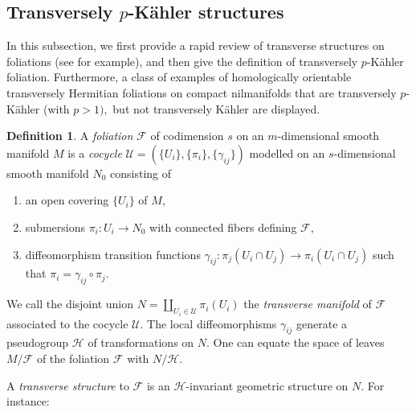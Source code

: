 \documentclass[12pt]{amsart}
\numberwithin{equation}{section}
\theoremstyle{definition}
\theoremstyle{definition}
\newtheorem{definition}  [theorem]     {Definition}
\theoremstyle{definition}
\renewcommand{\1}{\mathsf{1}}
\renewcommand{\>}{\rightarrow}
\def\mc{\mathcal}
\theoremstyle{plain} %
\theoremstyle{plain} %
\theoremstyle{plain} %
\begin{document}
	
	\subsection{Transversely $p$-K\"ahler structures}\label{subsection transversely }
	In this subsection, we first provide a rapid review of  transverse structures on foliations (see \cite{Mo88,Ni11} for example), and then give the definition of transversely $p$-K\"ahler foliation.  Furthermore, a class of examples of homologically orientable transversely Hermitian foliations on compact nilmanifolds that are transversely $p$-K\"ahler (with $p>1),$ but not transversely K\"ahler  are displayed.
	\begin{definition}
		A \textit{foliation} $\mathcal F$  of  codimension $s$ on an $m$-dimensional smooth manifold $M$ is a \textit{cocycle} $\mathscr U=(\{U_i\},\{\pi_i\},\{\gamma_{ij}\})$ modelled on an $s$-dimensional smooth manifold $N_0$ consisting of
		\begin{enumerate}[$(i)$]
			\item an open covering $\{U_i\}$ of $M$,
			\item submersions $\pi_i:U_i\to N_0$ with connected fibers defining $\mathcal{F}$,
			\item diffeomorphism transition functions $\gamma_{ij}:\pi_j(U_i\cap U_j)\to \pi_i(U_i\cap U_j)$ such that $\pi_i=\gamma_{ij}\circ \pi_j$.
		\end{enumerate}
		
	\end{definition}
	We call the disjoint union $N=\mathop\coprod_{U_{i}\in \mathscr U}
	\pi_{i}\left(U_{i}\right)$  the \textit{transverse manifold} of $\mathcal{F}$ associated to the cocycle $\mathscr U.$ The local diffeomorphisms $\gamma_{i j}$ generate a pseudogroup $\mathcal H$ of transformations on $N$. One can equate the space of leaves $M / \mathcal{F}$ of the foliation $\mathcal{F}$ with $N/ \mathcal H$.
	
	A \textit{transverse structure} to $\mathcal{F}$ is an $\mc H$-invariant geometric  structure on $N$. For instance:
	
\end{document}
